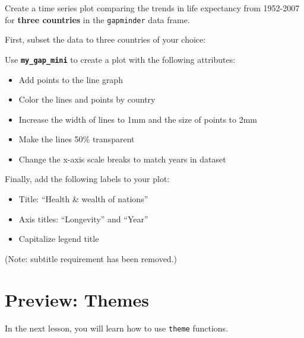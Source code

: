 \documentclass[
  letterpaper,
  DIV=11,
  numbers=noendperiod]{scrreprt}
\begin{document}
\begin{tcolorbox}[enhanced jigsaw, titlerule=0mm, colback=white, left=2mm, breakable, opacitybacktitle=0.6, colbacktitle=quarto-callout-tip-color!10!white, colframe=quarto-callout-tip-color-frame, bottomtitle=1mm, opacityback=0, coltitle=black, arc=.35mm, toptitle=1mm, title=\textcolor{quarto-callout-tip-color}{\faLightbulb}\hspace{0.5em}{Practice}, leftrule=.75mm, toprule=.15mm, bottomrule=.15mm, rightrule=.15mm]

Create a time series plot comparing the trends in life expectancy from
1952-2007 for \textbf{three countries} in the \texttt{gapminder} data
frame.

First, subset the data to three countries of your choice:

Use \textbf{\texttt{my\_gap\_mini}} to create a plot with the following
attributes:

\begin{itemize}
\item
  Add points to the line graph
\item
  Color the lines and points by country
\item
  Increase the width of lines to 1mm and the size of points to 2mm
\item
  Make the lines 50\% transparent
\item
  Change the x-axis scale breaks to match years in dataset
\end{itemize}

Finally, add the following labels to your plot:

\begin{itemize}
\item
  Title: ``Health \& wealth of nations''
\item
  Axis titles: ``Longevity'' and ``Year''
\item
  Capitalize legend title
\end{itemize}

(Note: subtitle requirement has been removed.)

\end{tcolorbox}

\section{Preview: Themes}\label{preview-themes}

In the next lesson, you will learn how to use \texttt{theme} functions.
\end{document}
